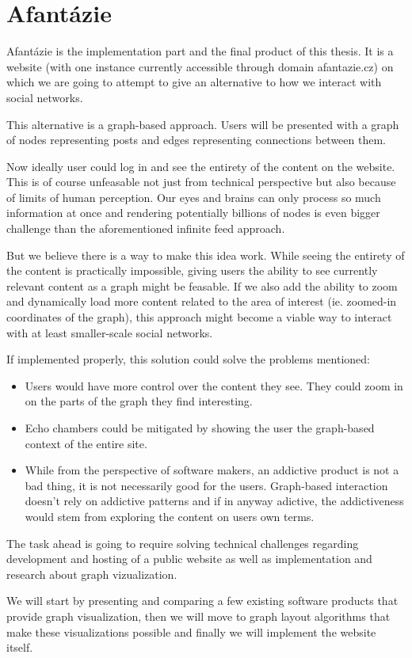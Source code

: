 \section*{Afantázie}
Afantázie is the implementation part and the final product of this thesis.
It is a website (with one instance currently accessible through domain afantazie.cz)
on which we are going to attempt to give an alternative to how we interact with social networks.

This alternative is a graph-based approach.
Users will be presented with a graph of nodes representing posts and edges representing connections between them.

Now ideally user could log in and see the entirety of the content on the website.
This is of course unfeasable not just from technical perspective but also because of limits of human perception.
Our eyes and brains can only process so much information at once
and rendering potentially billions of nodes is even bigger challenge than the aforementioned infinite feed approach.

But we believe there is a way to make this idea work.
While seeing the entirety of the content is practically impossible,
giving users the ability to see currently relevant content as a graph might be feasable.
If we also add the ability to zoom and dynamically load more content related to the area of interest (ie. zoomed-in coordinates of the graph),
this approach might become a viable way to interact with at least smaller-scale social networks.

If implemented properly, this solution could solve the problems mentioned:
\begin{itemize}
  \item Users would have more control over the content they see. They could zoom in on the parts of the graph they find interesting.
  \item Echo chambers could be mitigated by showing the user the graph-based context of the entire site.
  \item While from the perspective of software makers, an addictive product is not a bad thing, it is not necessarily good for the users.
    Graph-based interaction doesn't rely on addictive patterns and if in anyway adictive,
    the addictiveness would stem from exploring the content on users own terms.
\end{itemize}


The task ahead is going to require solving technical challenges regarding development and hosting of a public website
as well as implementation and research about graph vizualization.

We will start by presenting and comparing a few existing software products that provide graph visualization,
then we will move to graph layout algorithms that make these visualizations possible and finally we will implement the website itself.
